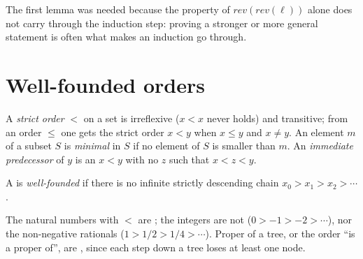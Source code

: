 \label{lst:b1:induction-and-termination:reverse}

\label{out:b1:induction-and-termination:reverse}

The first lemma was needed because the property of $\mathit{rev}(\mathit{rev}(\ell))$ alone does not carry through the
induction step: proving a stronger or more general statement is often what makes an induction go through.

\section{Well-founded orders}\label{sec:b1:induction-and-termination:orders}

\begin{definition}\label{def:b1:induction-and-termination:strict-order}
A \emph{strict order} $<$ on a set is irreflexive ($x < x$ never holds) and transitive; from an
order $\leq$ one gets the strict order $x < y$ when $x \leq y$ and $x \neq y$. An element $m$ of a subset $S$ is
\emph{minimal} in $S$ if no element of $S$ is smaller than $m$. An \emph{immediate
predecessor} of $y$ is an $x < y$ with no $z$ such that $x < z < y$.
\end{definition}

\begin{definition}\label{def:b1:induction-and-termination:well-founded}
A  is \emph{well-founded} if there is no infinite strictly descending chain $x_0
> x_1 > x_2 > \cdots$.
\end{definition}

The natural numbers with $<$ are ; the integers are not ($0 > -1 > -2 > \cdots$), nor the non-negative
rationals ($1 > 1/2 > 1/4 > \cdots$). Proper  of a tree, or the order ``is a proper  of'', are
, since each step down a tree loses at least one node.

